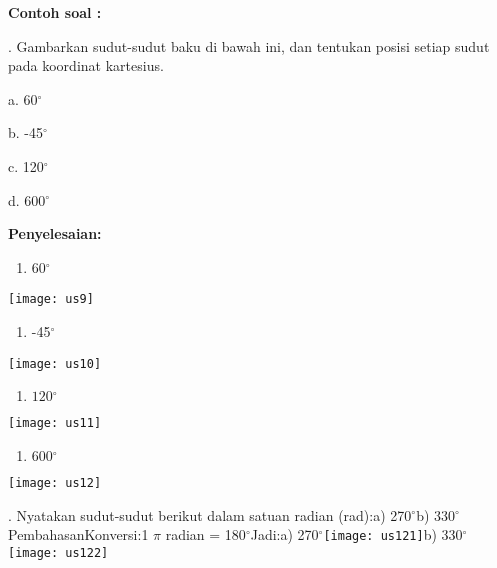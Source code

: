 \documentclass[11pt,fleqn]{book} %
\begin{document}
\noindent \textbf{}

\noindent \textbf{Contoh soal :}

. Gambarkan sudut-sudut baku di bawah ini, dan tentukan posisi setiap sudut pada koordinat kartesius. 

\noindent a. 60${}^\circ $

\noindent b. -45${}^\circ $

\noindent c. 120${}^\circ $ 

\noindent d. 600${}^\circ $

\noindent \textbf{Penyelesaian:}

\begin{enumerate}
\item \textbf{ }60$\boldsymbol{{}^\circ }$
\end{enumerate}

\noindent \texttt{[image: us9]}

\begin{enumerate}
\item  -45$\boldsymbol{{}^\circ }$
\end{enumerate}

\noindent \texttt{[image: us10]}

\noindent 

\noindent 

\begin{enumerate}
\item  $120\boldsymbol{{}^\circ }$
\end{enumerate}

\noindent \texttt{[image: us11]}

\begin{enumerate}
\item  $600\boldsymbol{{}^\circ }$
\end{enumerate}

\noindent \texttt{[image: us12]}

\noindent 

. Nyatakan sudut-sudut berikut dalam satuan radian (rad):a) 270$\mathrm{{}^\circ}$b) 330$\mathrm{{}^\circ}$PembahasanKonversi:1 $\pi$ radian = 180$\mathrm{{}^\circ}$Jadi:a) 270$\mathrm{{}^\circ}$\texttt{[image: us121]}b) 330${}^\circ$\texttt{[image: us122]}
\end{document}
